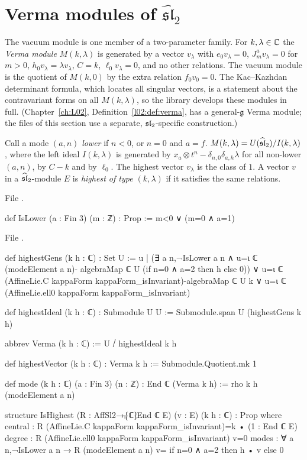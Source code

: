 \section{Verma modules of \texorpdfstring{$\widehat{\mathfrak{sl}}_2$}{affine sl2}}\label{l08:sec:verma}

The vacuum module is one member of a two-parameter family. For $k,\lambda\in{\mathbb{C}}$ the \emph{Verma module}
$M(k,\lambda)$ is generated by a vector $v_\lambda$ with $e_0v_\lambda = 0$, $J^a_mv_\lambda=0$ for $m>0$,
$h_0v_\lambda = \lambda v_\lambda$, $C=k$, $\ell_0v_\lambda = 0$, and no other relations. The vacuum module is the
quotient of $M(k,0)$ by the extra relation $f_0v_0 = 0$. The Kac--Kazhdan determinant formula, which
locates all singular vectors, is a statement about the contravariant forms on all $M(k,\lambda)$, so the
library develops these modules in full. (Chapter~\ref{ch:L02}, Definition~\ref{l02:def:verma}, has a
general-$\mathfrak g$ Verma module; the files of this section use a separate, $\mathfrak{sl}_2$-specific
construction.)

\begin{definition}\label{l08:def:verma}
Call a mode $(a,n)$ \emph{lower} if $n<0$, or $n=0$ and $a=f$. $M(k,\lambda) = U(\widehat{\mathfrak{sl}}_2)/I(k,\lambda)$,
where the left ideal $I(k,\lambda)$ is generated by $x_a\otimes t^n - \delta_{n,0}\delta_{a,h}\lambda$ for all
non-lower $(a,n)$, by $C-k$ and by $\ell_0$. The highest vector $v_\lambda$ is the class of $1$. A vector $v$ in a
$\widehat{\mathfrak{sl}}_2$-module $E$ is \emph{highest of type $(k,\lambda)$} if it satisfies the same relations.
\end{definition}

\noindent File .
\begin{leancode}
def IsLower (a : Fin 3) (m : ℤ) : Prop := m<0 ∨ (m=0 ∧ a=1)
\end{leancode}
\noindent File .
\begin{leancode}
def highestGens (k h : ℂ) : Set U := {u |
    (∃ a n,¬IsLower a n ∧ u=ι ℂ (modeElement a n)-
      algebraMap ℂ U (if n=0 ∧ a=2 then h else 0)) ∨
    u=ι ℂ (AffineLie.C kappaForm kappaForm_isInvariant)-algebraMap ℂ U k ∨
    u=ι ℂ (AffineLie.ell0 kappaForm kappaForm_isInvariant)}

def highestIdeal (k h : ℂ) : Submodule U U := Submodule.span U (highestGens k h)

abbrev Verma (k h : ℂ) := U ⧸ highestIdeal k h

def highestVector (k h : ℂ) : Verma k h := Submodule.Quotient.mk 1

def mode (k h : ℂ) (a : Fin 3) (n : ℤ) : End ℂ (Verma k h) := rho k h (modeElement a n)

structure IsHighest (R : AffSl2→ₗ⁅ℂ⁆End ℂ E) (v : E) (k h : ℂ) : Prop where
  central : R (AffineLie.C kappaForm kappaForm_isInvariant)=k • (1 : End ℂ E)
  degree : R (AffineLie.ell0 kappaForm kappaForm_isInvariant) v=0
  modes : ∀ a n,¬IsLower a n → R (modeElement a n) v=
    if n=0 ∧ a=2 then h • v else 0
\end{leancode}


